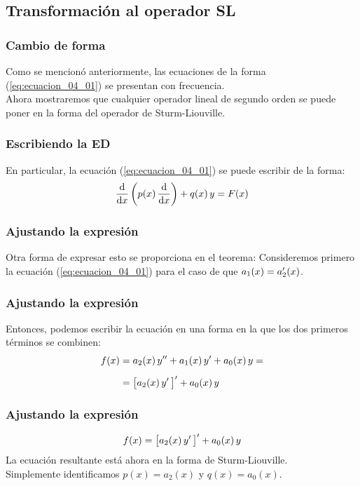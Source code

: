 \documentclass[12pt]{beamer}
\begin{document}
\subsection{Transformación al operador SL}

\begin{frame}
\frametitle{Cambio de forma}
Como se mencionó anteriormente, las ecuaciones de la forma (\ref{eq:ecuacion_04_01}) se presentan con frecuencia.
\\
\bigskip
\pause
Ahora mostraremos que cualquier operador lineal de segundo orden se puede poner en la forma del operador de Sturm-Liouville.
\end{frame}
\begin{frame}
\frametitle{Escribiendo la ED}
En particular, la ecuación (\ref{eq:ecuacion_04_01}) se puede escribir de la forma:
\pause
\begin{align}
\dv{x} \left( p(x) \, \dv{x} \right) + q(x) \, y =  F(x)
\label{eq:ecuacion_04_05}
\end{align}
\end{frame}
\begin{frame}
\frametitle{Ajustando la expresión}
Otra forma de expresar esto se proporciona en el teorema: \pause Consideremos primero la ecuación (\ref{eq:ecuacion_04_01}) para el caso de que $a_{1} (x) = {a}^{\prime}_{2} (x)$.
\end{frame}
\begin{frame}
\frametitle{Ajustando la expresión}
Entonces, podemos escribir la ecuación en una forma en la que los dos primeros términos se combinen:
\pause
\begin{align}
\begin{aligned}
f(x) &= a_{2} (x) \, {y}^{\prime \prime} + a_{1} (x) \, {y}^{\prime} + a_{0} (x) \, y = \\[0.5em]
&= \big[ a_{2} (x) \, {y}^{\prime} \, \big]^{\prime} + a_{0} (x) \, y
\end{aligned}
\label{eq:ecuacion_04_06}
\end{align}
\end{frame}
\begin{frame}
\frametitle{Ajustando la expresión}
\begin{align*}
f(x) = \big[ a_{2} (x) \, {y}^{\prime} \, \big]^{\prime} + a_{0} (x) \, y
\end{align*}
La ecuación resultante está ahora en la forma de Sturm-Liouville.
\\
\bigskip
Simplemente identificamos $p(x) = a_{2} (x)$ y $q (x) = a_{0} (x)$.
\end{frame}
\end{document}

